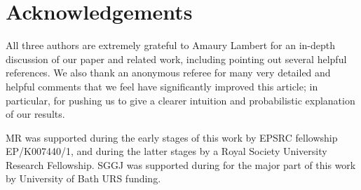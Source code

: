 \documentclass{article}
\theoremstyle{plain}
\theoremstyle{definition}
\begin{document}
\section*{Acknowledgements}
All three authors are extremely grateful to Amaury Lambert for an in-depth discussion of our paper and related work, including pointing out several helpful references. We also thank an anonymous referee for many very detailed and helpful comments that we feel have significantly improved this article; in particular, for pushing us to give a clearer intuition and probabilistic explanation of our results. 

MR was supported during the early stages of this work by EPSRC fellowship EP/K007440/1, and during the latter stages by a Royal Society University Research Fellowship.
SGGJ was supported during for the major part of this work by University of Bath URS funding. 
\end{document}

